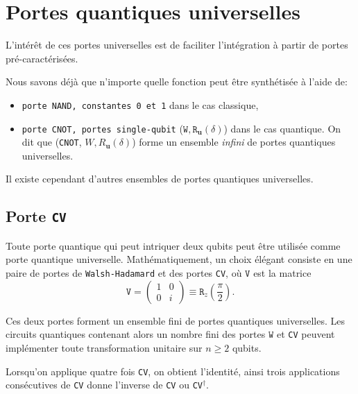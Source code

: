 \section{Portes quantiques universelles}
\label{sec:PQUniv}

L'intérêt de ces portes universelles est de faciliter l'intégration à partir
de portes pré-caractérisées.

Nous savons déjà que n'importe quelle fonction peut être synthétisée à l'aide
de:
\begin{itemize}
\item {\texttt{porte NAND, constantes 0 et 1}} dans le cas classique,

\item {\texttt{porte CNOT, portes single-qubit}}
($\mathtt{W},\mathtt{R}_{\boldsymbol{u}}(\delta)$) dans le cas quantique. On dit
que (\texttt{CNOT}, $W,R_{\boldsymbol{u}}(\delta)$) forme un ensemble
\emph{infini} de portes quantiques universelles.
\end{itemize}

Il existe cependant d'autres ensembles de portes quantiques universelles.

\subsection{Porte \texttt{CV}}

\medskip\colorbox[gray]{0.8}{
\parbox[c]{0.9\textwidth}{
\begin{proposition}
Toute porte quantique qui peut intriquer deux qubits peut être utilisée comme
porte quantique universelle. Mathématiquement, un choix élégant consiste en une
paire de portes de \texttt{Walsh-Hadamard} et des portes \texttt{CV}, où
$\mathtt{V}$ est la matrice%
\begin{equation}
\mathtt{V}=\begin{pmatrix}
1 & 0\\
0 & i
\end{pmatrix}
\equiv \mathtt{R}_{z}(\frac{\pi}{2}).
\end{equation}
\end{proposition}
}}\medskip

Ces deux portes forment un ensemble fini de portes quantiques universelles.
Les circuits quantiques contenant alors un nombre fini des portes $\mathtt{W}$
et \texttt{CV} peuvent implémenter toute transformation unitaire sur $n\geq2$
qubits.

Lorsqu'on applique quatre fois \texttt{CV}, on obtient l'identité, ainsi trois
applications consécutives de \texttt{CV} donne l'inverse de \texttt{CV} ou
\texttt{CV}$^{\dagger}$.

